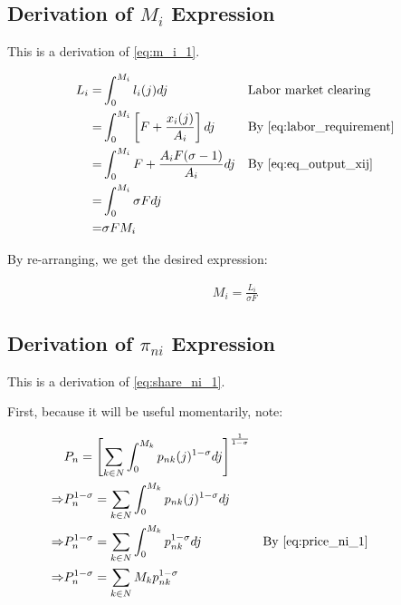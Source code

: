 \documentclass[10pt]{article}
\begin{document}

\subsection{Derivation of $M_i$ Expression}
\label{sec:m_i_1}

This is a derivation of \eqref{eq:m_i_1}.

\begin{align}
    L_i = &\int_{0}^{M_i} l_i(j) dj && \parbox[t]{4cm}{\raggedright Labor market clearing}\\
    = & \int_{0}^{M_i} \left[F + \frac{x_i(j)}{A_i}\right] dj && \text{By \eqref{eq:labor_requirement}} \\
    = &\int_{0}^{M_i} F + \frac{A_i F (\sigma -1)}{A_i} dj && \text{By \eqref{eq:eq_output_xij}} \\
    = &\int_{0}^{M_i} \sigma F dj \\
    = & \sigma F M_i
\end{align}

By re-arranging, we get the desired expression:

\begin{align}
    M_i = \frac{L_i}{\sigma F}
\end{align}

\subsection{Derivation of $\pi_{n i}$ Expression}
\label{sec:share_ni_1}

This is a derivation of \eqref{eq:share_ni_1}.

First, because it will be useful momentarily, note:

\begin{align}
    &P_n=\left[\sum_{k \in N} \int_0^{M_k} p_{n k}(j)^{1-\sigma} d j\right]^{\frac{1}{1-\sigma}} \\
    \Rightarrow &P_n^{1-\sigma} = \sum_{k \in N} \int_0^{M_k} p_{n k}(j)^{1-\sigma} d j \\
    \Rightarrow &P_n^{1-\sigma} = \sum_{k \in N} \int_0^{M_k} p_{nk}^{1-\sigma} d j && \parbox[t]{4cm}{\raggedright By \eqref{eq:price_ni_1}} \\
    \Rightarrow &P_n^{1-\sigma} = \sum_{k \in N} M_k p_{nk}^{1-\sigma} \label{eq:price_ind_interm_share_ni_1}
\end{align}
\end{document}
